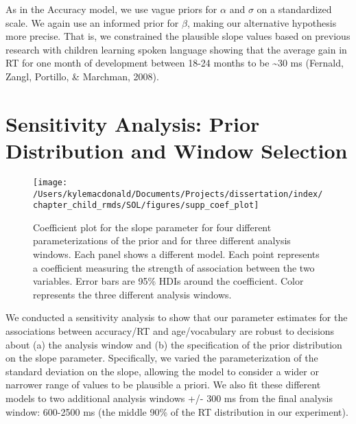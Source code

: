 \documentclass[oneside]{report}
\begin{document}
As in the Accuracy model, we use vague priors for \(\alpha\) and
\(\sigma\) on a standardized scale. We again use an informed prior for
\(\beta\), making our alternative hypothesis more precise. That is, we
constrained the plausible slope values based on previous research with
children learning spoken language showing that the average gain in RT
for one month of development between 18-24 months to be
\textasciitilde{}30 ms (Fernald, Zangl, Portillo, \& Marchman, 2008).

\section{Sensitivity Analysis: Prior Distribution and Window
Selection}\label{sensitivity-analysis-prior-distribution-and-window-selection}
\begin{figure}[t]

{\centering \texttt{[image: /Users/kylemacdonald/Documents/Projects/dissertation/index/chapter\_child\_rmds/SOL/figures/supp\_coef\_plot]} 

}

\caption[Results of sensitivity analysis for Experiment 1.1.]{Coefficient plot for the slope parameter for four different parameterizations of the prior and for three different analysis windows. Each panel shows a different model. Each point represents a coefficient measuring the strength of association between the two variables. Error bars are 95\% HDIs around the coefficient. Color represents the three different analysis windows.}\label{fig:unnamed-chunk-10}
\end{figure}
We conducted a sensitivity analysis to show that our parameter estimates
for the associations between accuracy/RT and age/vocabulary are robust
to decisions about (a) the analysis window and (b) the specification of
the prior distribution on the slope parameter. Specifically, we varied
the parameterization of the standard deviation on the slope, allowing
the model to consider a wider or narrower range of values to be
plausible a priori. We also fit these different models to two additional
analysis windows +/- 300 ms from the final analysis window: 600-2500 ms
(the middle 90\% of the RT distribution in our experiment).
\end{document}
